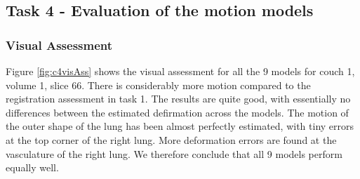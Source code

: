 \documentclass[11pt,a4paper,oneside]{report}
\begin{document}
\subsection*{Task 4 - Evaluation of the motion models}

\subsubsection*{Visual Assessment}

Figure \ref{fig:c4visAss} shows the visual assessment for all the 9 models for couch 1, volume 1, slice 66. There is considerably more motion compared to the registration assessment in task 1. The results are quite good, with essentially no differences between the estimated defirmation across the models. The motion of the outer shape of the lung has been almost perfectly estimated, with tiny errors at the top corner of the right lung. More deformation errors are found at the vasculature of the right lung. We therefore conclude that all 9 models perform equally well.
\end{document}
